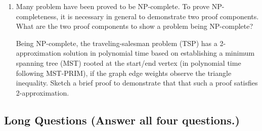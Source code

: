 \begin{enumerate}
	\item Many problem have been proved to be NP-complete.  To prove NP-completeness, it is necessary in general to demonstrate two proof components.  What are the two proof components to show a problem being NP-complete?
	
	Being NP-complete, the traveling-salesman problem (TSP) has a 2-approximation solution in polynomial time based on establishing a minimum spanning tree (MST) rooted at the start/end vertex (in polynomial time following MST-PRIM), if the graph edge weights observe the triangle inequality.  Sketch a brief proof to demonstrate that that such a proof satisfies 2-approximation.  

	 
\end{enumerate}	

\subsection{Long Questions (Answer all four questions.)}

